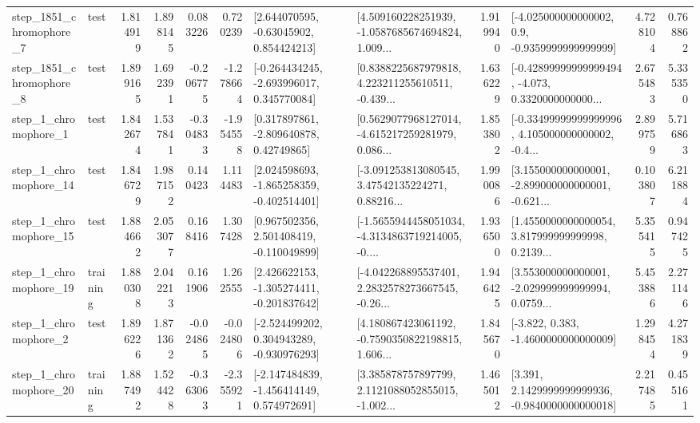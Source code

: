 \begin{tabular}{llrrrrllrlrr}
  step\_1851\_chromophore\_7 &      test &      1.814919 &    1.898145 &      0.083226 &  0.720239 &     [2.644070595, -0.63045902, 0.854424213] &  [4.509160228251939, -1.0587685674694824, 1.009... &       1.919940 &     [-4.025000000000002, 0.9, -0.9359999999999999] &            4.728104 &          0.768862 \\
  step\_1851\_chromophore\_8 &      test &      1.899165 &    1.692391 &     -0.206775 & -1.278664 &   [-0.264434245, -2.693996017, 0.345770084] &  [0.8388225687979818, 4.223211255610511, -0.439... &       1.636229 &  [-0.42899999999999494, -4.073, 0.3320000000000... &            2.675483 &          5.335350 \\
     step\_1\_chromophore\_1 &      test &      1.842674 &    1.537841 &     -0.304833 & -1.954558 &     [0.317897861, -2.809640878, 0.42749865] &  [0.5629077968127014, -4.615217259281979, 0.086... &       1.853802 &  [-0.33499999999999996, 4.105000000000002, -0.4... &            2.899759 &          5.716863 \\
    step\_1\_chromophore\_14 &      test &      1.846729 &    1.987152 &      0.140423 &  1.114483 &   [2.024598693, -1.865258359, -0.402514401] &  [-3.091253813080545, 3.47542135224271, 0.88216... &       1.990086 &  [3.155000000000001, -2.899000000000001, -0.621... &            0.103807 &          6.211884 \\
    step\_1\_chromophore\_15 &      test &      1.884662 &    2.053077 &      0.168416 &  1.307428 &    [0.967502356, 2.501408419, -0.110049899] &  [-1.5655944458051034, -4.3134863719214005, -0.... &       1.936500 &  [1.4550000000000054, 3.817999999999998, 0.2139... &            5.355415 &          0.947425 \\
    step\_1\_chromophore\_19 &  training &      1.880308 &    2.042213 &      0.161906 &  1.262555 &   [2.426622153, -1.305274411, -0.201837642] &  [-4.042268895537401, 2.2832578273667545, -0.26... &       1.946425 &  [3.553000000000001, -2.029999999999994, 0.0759... &            5.453886 &          2.271146 \\
     step\_1\_chromophore\_2 &      test &      1.896226 &    1.871362 &     -0.024865 & -0.024806 &   [-2.524499202, 0.304943289, -0.930976293] &  [4.180867423061192, -0.7590350822198815, 1.606... &       1.845670 &               [-3.822, 0.383, -1.4600000000000009] &            1.298454 &          4.271839 \\
    step\_1\_chromophore\_20 &  training &      1.887492 &    1.524428 &     -0.363063 & -2.355921 &   [-2.147484839, -1.456414149, 0.574972691] &  [3.385878757897799, 2.1121088052855015, -1.002... &       1.465012 &   [3.391, 2.1429999999999936, -0.9840000000000018] &            2.217485 &          0.455161 \\

\end{tabular}

